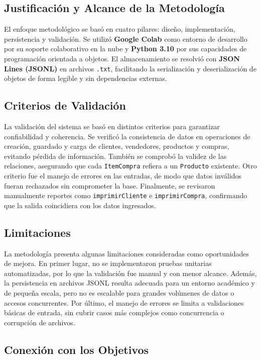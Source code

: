 \documentclass[11pt]{article}
\begin{document}
\begin{enumerate}
\subsection{Justificación y Alcance de la Metodología}
El enfoque metodológico se basó en cuatro pilares: diseño, implementación, persistencia y validación. 
Se utilizó \textbf{Google Colab} como entorno de desarrollo por su soporte colaborativo en la nube y \textbf{Python 3.10} por sus capacidades de programación orientada a objetos. 
El almacenamiento se resolvió con \textbf{JSON Lines (JSONL)} en archivos \texttt{.txt}, facilitando la serialización y deserialización de objetos de forma legible y sin dependencias externas.


\subsection{Criterios de Validación}

La validación del sistema se basó en distintos criterios para garantizar confiabilidad y coherencia. 
Se verificó la consistencia de datos en operaciones de creación, guardado y carga de clientes, vendedores, productos y compras, evitando pérdida de información. 
También se comprobó la validez de las relaciones, asegurando que cada \texttt{ItemCompra} refiera a un \texttt{Producto} existente. 
Otro criterio fue el manejo de errores en las entradas, de modo que datos inválidos fueran rechazados sin comprometer la base. 
Finalmente, se revisaron manualmente reportes como \texttt{imprimirCliente} e \texttt{imprimirCompra}, confirmando que la salida coincidiera con los datos ingresados.


\subsection{Limitaciones}

La metodología presenta algunas limitaciones consideradas como oportunidades de mejora. 
En primer lugar, no se implementaron pruebas unitarias automatizadas, por lo que la validación fue manual y con menor alcance. 
Además, la persistencia en archivos JSONL resulta adecuada para un entorno académico y de pequeña escala, pero no es escalable para grandes volúmenes de datos o accesos concurrentes. 
Por último, el manejo de errores se limita a validaciones básicas de entrada, sin cubrir casos más complejos como concurrencia o corrupción de archivos.

\subsection{Conexión con los Objetivos}


\end{enumerate}
\end{document}
